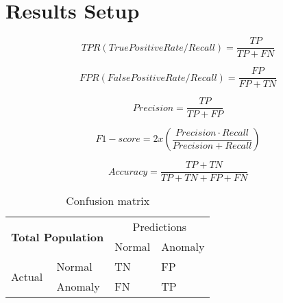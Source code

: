 \section{Results Setup}

\begin{equation}
    TPR(TruePositiveRate/Recall) = \frac{TP}{TP + FN}
\end{equation}

\begin{equation}
    FPR(FalsePositiveRate/Recall) = \frac{FP}{FP + TN}
\end{equation}

\begin{equation}
    Precision = \frac{TP}{TP + FP}
\end{equation}

\begin{equation}
    F1 - score = 2 x (\frac{Precision \cdot Recall}{Precision + Recall})
\end{equation}

\begin{equation}
    Accuracy = \frac{TP + TN}{TP + TN + FP + FN}
\end{equation}


\begin{table}[h]
\centering
\begin{tabular}{|ll|ll|}
\hline
\multicolumn{2}{|c|}{\multirow{2}{*}{\textbf{Total Population}}} & \multicolumn{2}{c|}{Predictions}      \\ \cline{3-4} 
\multicolumn{2}{|c|}{}                                           & \multicolumn{1}{l|}{Normal} & Anomaly \\ \hline
\multicolumn{1}{|l|}{\multirow{2}{*}{Actual}}      & Normal      & \multicolumn{1}{l|}{TN}     & FP      \\ \cline{2-4} 
\multicolumn{1}{|l|}{}                             & Anomaly     & \multicolumn{1}{l|}{FN}     & TP      \\ \hline
\end{tabular}
\label{tab:confmat}
\caption{Confusion matrix}
\end{table}

